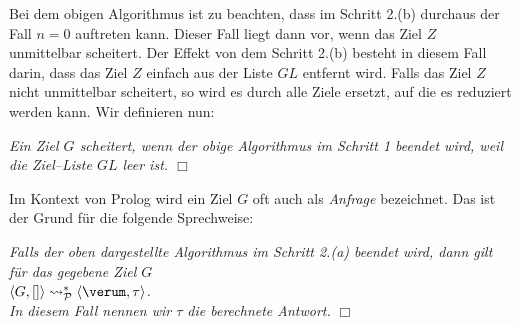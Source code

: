 Bei dem obigen Algorithmus ist zu beachten, dass im Schritt 2.(b) durchaus der Fall $n=0$
auftreten kann.  Dieser Fall liegt dann vor, wenn das Ziel $Z$ unmittelbar scheitert.  Der Effekt von
dem Schritt 2.(b) besteht in diesem Fall darin, dass das Ziel $Z$ einfach aus der Liste $G\!L$
entfernt wird.  Falls das Ziel $Z$ nicht unmittelbar scheitert, so wird es durch alle
Ziele ersetzt, auf die es reduziert werden kann.  Wir definieren nun:
\begin{Definition}[Scheitern]
{\em
    Ein Ziel $G$ \emph{scheitert}, wenn der obige Algorithmus im Schritt 1 beendet wird, weil die 
    Ziel--Liste $G\!L$ leer ist.
\hspace*{\fill} $\Box$
}
\end{Definition}

Im Kontext von Prolog wird ein Ziel $G$  oft auch als \emph{Anfrage} bezeichnet. 
Das ist der Grund f\"{u}r die folgende Sprechweise:
\begin{Definition}
{\em
  Falls der oben dargestellte Algorithmus im Schritt 2.(a) beendet wird, dann gilt f\"{u}r das gegebene Ziel
  $G$ \\[0.1cm]
  \hspace*{1.3cm} $\langle G, [] \rangle \leadsto_\mathcal{P}^* \langle \verum, \tau \rangle$. \\[0.1cm]
  In diesem Fall nennen wir $\tau$ die \emph{berechnete Antwort}. 
} \hspace*{\fill} $\Box$
\end{Definition}

